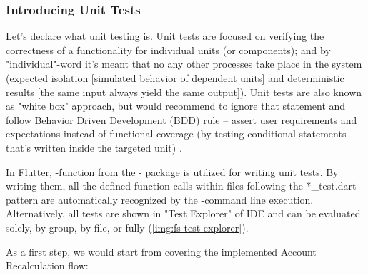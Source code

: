 \subsubsection{Introducing Unit Tests} \label{ut-unit}

Let's declare what unit testing is. Unit tests are focused on verifying the correctness of a functionality for 
individual units (or components); and by "individual"-word it's meant that no any other processes take place in the 
system (expected isolation [simulated behavior of dependent units] and deterministic results [the same input always 
yield the same output]). Unit tests are also known as "white box" approach, but would recommend to ignore that 
statement and follow Behavior Driven Development (BDD) rule -- assert user requirements and expectations instead of 
functional coverage (by testing conditional statements that's written inside the targeted unit) \cite{Crispin09}.

In Flutter, -function from the - package is utilized for writing unit tests. By writing them, 
all the defined function calls within files following the *\_test.dart pattern are automatically recognized by the 
-command line execution. Alternatively, all tests are shown in "Test Explorer" of IDE and can be
evaluated solely, by group, by file, or fully (\cref{img:fs-test-explorer}).


\noindent As a first step, we would start from covering the implemented Account Recalculation flow:

